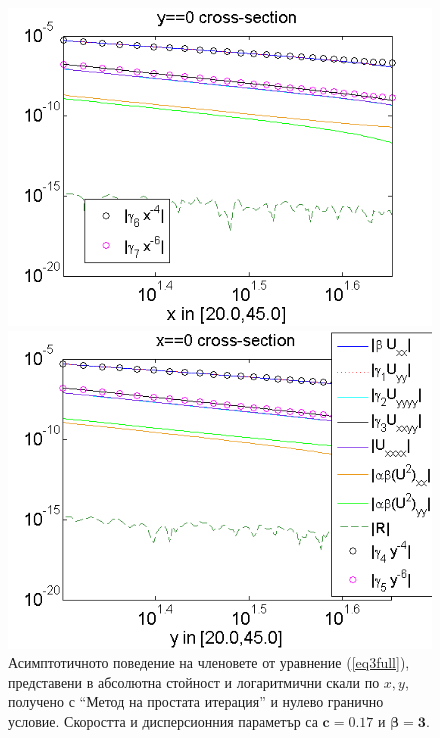 \documentclass[a4paper]{article}
\newcommand{\rf}[1]{(\ref{#1})}
\theoremstyle{remark}
\begin{document}
\FloatBarrier
\begin{figure}[ht]
	\begin{minipage}[b]{0.95\linewidth}
		\raggedleft
		\includegraphics[width=\linewidth]{AssymptForEachTerm/c017_bt1_5/ChristovIC_AlongX_50_ZB2_bt3_c017_h020_O(h^6).png}
	\end{minipage}
	\begin{minipage}[b]{0.95\linewidth}
		 \raggedright
		\includegraphics[width=\linewidth]{AssymptForEachTerm/c017_bt1_5/ChristovIC_AlongY_50_ZB2_bt3_c017_h020_O(h^6).png}
	\end{minipage}
	\caption{Асимптотичното поведение на членовете от уравнение \rf{eq3full}, представени в абсолютна стойност и логаритмични скали по $x,y$, получено с ``Метод на простата итерация'' и нулево гранично условие. Скоростта и дисперсионния параметър са $\boldsymbol{c=0.17}$ и $\boldsymbol{\beta = 3}$.}
	\label{fig:assympt_c017bt3}
\end{figure}
\end{document}
